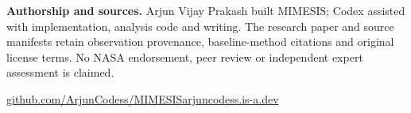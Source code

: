 \documentclass[11pt,a4paper]{article}
\begin{document}
\textbf{Authorship and sources.} Arjun Vijay Prakash built MIMESIS; Codex assisted with implementation, analysis code and writing. The research paper and source manifests retain observation provenance, baseline-method citations and original license terms. No NASA endorsement, peer review or independent expert assessment is claimed.

\vfill
\href{https://github.com/ArjunCodess/MIMESIS}{github.com/ArjunCodess/MIMESIS}\hfill \href{https://arjuncodess.is-a.dev/}{arjuncodess.is-a.dev}
\end{document}
